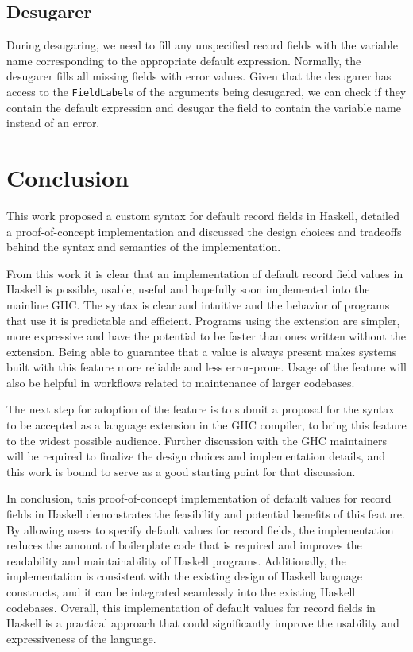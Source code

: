 \documentclass[en]{pracamgr}
\newcommand{\code}[1]{\lstinline[breaklines=true]{#1}}
\begin{document}
\section{Desugarer}
During desugaring, we need to fill any unspecified record fields with the variable name corresponding to the appropriate default expression.
Normally, the desugarer fills all missing fields with error values.
Given that the desugarer has access to the \code{FieldLabel}s of the arguments being desugared, we can check if they contain the default expression and desugar the field to contain the variable name instead of an error.

\chapter{Conclusion}\label{ch:concl}
This work proposed a custom syntax for default record fields in Haskell, detailed a proof-of-concept implementation and discussed the design choices
and tradeoffs behind the syntax and semantics of the implementation.

From this work it is clear that an implementation of default record field values in Haskell is possible, usable, useful and hopefully soon implemented
into the mainline GHC. The syntax is clear and intuitive and the behavior of programs that use it is predictable and efficient.
Programs using the extension are simpler, more expressive and have the potential to be faster than ones written without the extension.
Being able to guarantee that a value is always present makes systems built with this feature more reliable and less error-prone.
Usage of the feature will also be helpful in workflows related to maintenance of larger codebases.

The next step for adoption of the feature is to submit a proposal for the syntax to be accepted 
as a language extension in the GHC compiler, to bring this feature to the widest possible audience.
Further discussion with the GHC maintainers will be required to finalize the design choices and implementation details, 
and this work is bound to serve as a good starting point for that discussion.

In conclusion, this proof-of-concept implementation of default values for record fields in Haskell
demonstrates the feasibility and potential benefits of this feature. 
By allowing users to specify default values for record fields, 
the implementation reduces the amount of boilerplate code that is 
required and improves the readability and maintainability of Haskell programs.
Additionally, the implementation is consistent with the existing design of Haskell language constructs, 
and it can be integrated seamlessly into the existing Haskell codebases. 
Overall, this implementation of default values for record fields in Haskell 
is a practical approach that could significantly improve the usability and expressiveness of the language.
\end{document}
